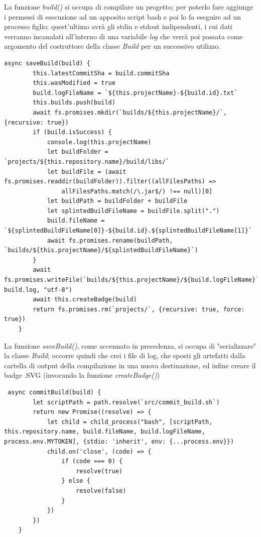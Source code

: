 \documentclass{report}
\begin{document}
La funzione \textit{build()} si occupa di compilare un progetto; per poterlo fare aggiunge i permessi di esecuzione ad un apposito script bash e poi lo fa eseguire ad un processo figlio; quest'ultimo avrà gli stdin e stdout indipendenti, i cui dati verranno incanalati all'interno di una variabile \textit{log} che verrà poi passata come argomento del costruttore della classe \textit{Build} per un successivo utilizzo.
\begin{lstlisting}
async saveBuild(build) {
        this.latestCommitSha = build.commitSha
        this.wasModified = true
        build.logFileName = `${this.projectName}-${build.id}.txt`
        this.builds.push(build)
        await fs.promises.mkdir(`builds/${this.projectName}/`, {recursive: true})
        if (build.isSuccess) {
            console.log(this.projectName)
            let buildFolder = `projects/${this.repository.name}/build/libs/`
            let buildFile = (await fs.promises.readdir(buildFolder)).filter((allFilesPaths) =>
                allFilesPaths.match(/\.jar$/) !== null)[0]
            let buildPath = buildFolder + buildFile
            let splintedBuildFileName = buildFile.split(".")
            build.fileName = `${splintedBuildFileName[0]}-${build.id}.${splintedBuildFileName[1]}`
            await fs.promises.rename(buildPath, `builds/${this.projectName}/${splintedBuildFileName}`)
        }
        await fs.promises.writeFile(`builds/${this.projectName}/${build.logFileName}`, build.log, "utf-8")
        await this.createBadge(build)
        return fs.promises.rm(`projects/`, {recursive: true, force: true})
    }
\end{lstlisting}
La funzione \textit{saveBuild()}, come accennato in precedenza, si occupa di "serializzare" la classe \textit{Build}; occorre quindi che crei i file di log, che sposti gli artefatti dalla cartella di output della compilazione in una nuova destinazione, ed infine creare il badge .SVG (invocando la funzione \textit{createBadge()})
\begin{lstlisting}
 async commitBuild(build) {
        let scriptPath = path.resolve(`src/commit_build.sh`)
        return new Promise((resolve) => {
            let child = child_process("bash", [scriptPath, this.repository.name, build.fileName, build.logFileName, process.env.MYTOKEN], {stdio: 'inherit', env: {...process.env}})
            child.on('close', (code) => {
                if (code === 0) {
                    resolve(true)
                } else {
                    resolve(false)
                }
            })
        })
    }
\end{lstlisting}
\end{document}
